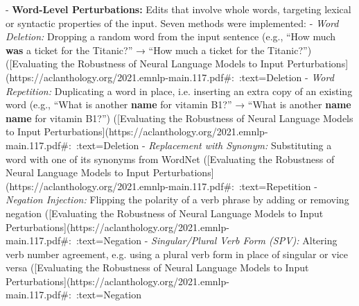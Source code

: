 - \textbf{Word-Level Perturbations:} Edits that involve whole words, targeting lexical or syntactic properties of the input. Seven methods were implemented:  
  - \textit{Word Deletion:} Dropping a random word from the input sentence (e.g., “How much \textbf{was} a ticket for the Titanic?” → “How much a ticket for the Titanic?”) ([Evaluating the Robustness of Neural Language Models to Input Perturbations](https://aclanthology.org/2021.emnlp-main.117.pdf#:~:text=Deletion%
  - \textit{Word Repetition:} Duplicating a word in place, i.e. inserting an extra copy of an existing word (e.g., “What is another \textbf{name} for vitamin B1?” → “What is another \textbf{name name} for vitamin B1?”) ([Evaluating the Robustness of Neural Language Models to Input Perturbations](https://aclanthology.org/2021.emnlp-main.117.pdf#:~:text=Deletion%
  - \textit{Replacement with Synonym:} Substituting a word with one of its synonyms from WordNet ([Evaluating the Robustness of Neural Language Models to Input Perturbations](https://aclanthology.org/2021.emnlp-main.117.pdf#:~:text=Repetition%
  - \textit{Negation Injection:} Flipping the polarity of a verb phrase by adding or removing negation ([Evaluating the Robustness of Neural Language Models to Input Perturbations](https://aclanthology.org/2021.emnlp-main.117.pdf#:~:text=Negation%
  - \textit{Singular/Plural Verb Form (SPV):} Altering verb number agreement, e.g. using a plural verb form in place of singular or vice versa ([Evaluating the Robustness of Neural Language Models to Input Perturbations](https://aclanthology.org/2021.emnlp-main.117.pdf#:~:text=Negation%
